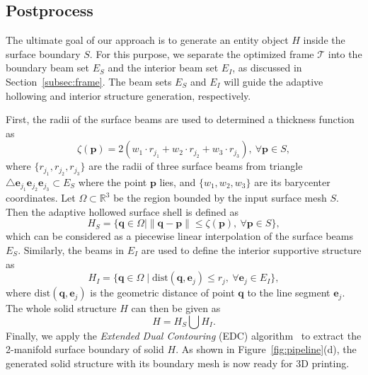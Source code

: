 \subsection{Postprocess}
\label{subsec:post-processing}


The ultimate goal of our approach is to generate an entity object $H$ inside the surface boundary $S$.
For this purpose, we separate the optimized frame $\mathcal{T}$ into the boundary beam set $E_S$ and the interior beam set $E_I$, as discussed in Section~\ref{subsec:frame}. The beam sets $E_S$ and $E_I$ will guide the adaptive hollowing and interior structure generation, respectively.

First, the radii of the surface beams are used to determined a thickness function as
\[
\zeta(\mathbf{p})= 2(w_1 \cdot r_{j_1} + w_2 \cdot r_{j_2} + w_3 \cdot r_{j_3}), \  \forall \mathbf{p}\in S,
\]
where $\{r_{j_1},r_{j_2},r_{j_3}\}$ are the radii of three surface beams from triangle $\triangle \mathbf{e}_{j_1}\mathbf{e}_{j_2}\mathbf{e}_{j_3}\subset E_S$ where the point $\mathbf{p}$ lies, and $\{w_1,w_2,w_3\}$ are its barycenter coordinates.
%
Let $\Omega\subset\mathbb{R}^3$ be the region bounded by the input surface mesh $S$.
%
Then the adaptive hollowed surface shell is defined as
\begin{equation} \label{eq:adaptive-shell}
H_S=\{\mathbf{q}\in\Omega \mid \|\mathbf{q}-\mathbf{p}\| \leqslant \zeta(\mathbf{p}), \ \forall\mathbf{p}\in S \},
\end{equation}
which can be considered as a piecewise linear interpolation of the surface beams $E_S$.
%
Similarly, the beams in $E_I$ are used to define the interior supportive structure as
\begin{equation} \label{eq:interior-structure}
H_I=\{\mathbf{q}\in\Omega \mid \mathrm{dist}(\mathbf{q}, \mathbf{e}_j) \leqslant r_j, \ \forall\mathbf{e}_j\in E_I \},
\end{equation}
where $\mathrm{dist}(\mathbf{q}, \mathbf{e}_j)$ is the geometric distance of point $\mathbf{q}$ to the line segment $\mathbf{e}_j$.
%
The whole solid structure $H$ can then be given as
\[
H = H_S \bigcup H_I.
\]
Finally, we apply the \emph{Extended Dual Contouring} (EDC) algorithm~\cite{cwang:2013} to extract the 2-manifold surface boundary of solid $H$.
%
As shown in Figure~\ref{fig:pipeline}(d), the generated solid structure with its boundary mesh is now ready for 3D printing.




